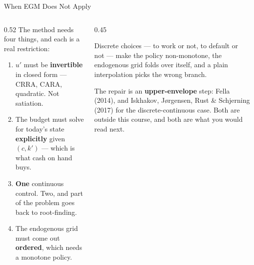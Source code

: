 \begin{frame}{When EGM Does Not Apply}
\begin{columns}[T]
\begin{column}{0.52\textwidth}
\small
The method needs four things, and each is a real restriction:
\begin{enumerate}\footnotesize
  \item $u'$ must be \textbf{invertible} in closed form --- CRRA, CARA, quadratic. Not satiation.
  \item The budget must solve for today's state \textbf{explicitly} given $(c,k')$ --- which is what cash on hand buys.
  \item \textbf{One} continuous control. Two, and part of the problem goes back to root-finding.
  \item The endogenous grid must come out \textbf{ordered}, which needs a monotone policy.
\end{enumerate}
\end{column}
\begin{column}{0.45\textwidth}
\begin{cautionbox}[title=\textbf{What breaks item 4}]\small
Discrete choices --- to work or not, to default or not --- make the policy non-monotone, the endogenous grid folds over itself, and a plain interpolation picks the wrong branch.
\end{cautionbox}
\medskip
\begin{examplebox}\footnotesize
The repair is an \textbf{upper-envelope} step: Fella (2014), and Iskhakov, J\o rgensen, Rust \& Schjerning (2017) for the discrete-continuous case. Both are outside this course, and both are what you would read next.
\end{examplebox}
\end{column}
\end{columns}
\vspace{1mm}
\end{frame}

